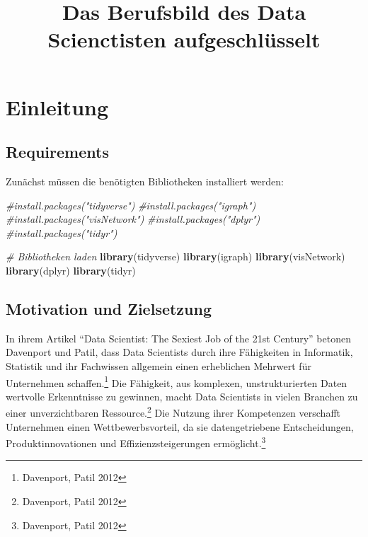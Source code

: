 \documentclass[
]{article}
\title{Das Berufsbild des Data Scienctisten aufgeschlüsselt}
\author{}
\date{\vspace{-2.5em}}
\newenvironment{Shaded}{\begin{snugshade}}{\end{snugshade}}
\newcommand{\CommentTok}[1]{\textcolor[rgb]{0.56,0.35,0.01}{\textit{#1}}}
\newcommand{\FunctionTok}[1]{\textcolor[rgb]{0.13,0.29,0.53}{\textbf{#1}}}
\newcommand{\NormalTok}[1]{#1}
\begin{document}
\maketitle

{
\setcounter{tocdepth}{3}
\tableofcontents
}
\newpage

\section{Einleitung}\label{einleitung}

\subsection{Requirements}\label{requirements}

Zunächst müssen die benötigten Bibliotheken installiert werden:

\begin{Shaded}
\begin{Highlighting}[]
\CommentTok{\#install.packages("tidyverse")}
\CommentTok{\#install.packages("igraph")}
\CommentTok{\#install.packages("visNetwork")}
\CommentTok{\#install.packages("dplyr")}
\CommentTok{\#install.packages("tidyr")}
\end{Highlighting}
\end{Shaded}

\begin{Shaded}
\begin{Highlighting}[]
\CommentTok{\# Bibliotheken laden}
\FunctionTok{library}\NormalTok{(tidyverse)}
\FunctionTok{library}\NormalTok{(igraph)}
\FunctionTok{library}\NormalTok{(visNetwork)}
\FunctionTok{library}\NormalTok{(dplyr)}
\FunctionTok{library}\NormalTok{(tidyr)}
\end{Highlighting}
\end{Shaded}

\subsection{Motivation und
Zielsetzung}\label{motivation-und-zielsetzung}

In ihrem Artikel ``Data Scientist: The Sexiest Job of the 21st Century''
betonen Davenport und Patil, dass Data Scientists durch ihre Fähigkeiten
in Informatik, Statistik und ihr Fachwissen allgemein einen erheblichen
Mehrwert für Unternehmen schaffen.\footnote{Davenport, Patil 2012} Die
Fähigkeit, aus komplexen, unstrukturierten Daten wertvolle Erkenntnisse
zu gewinnen, macht Data Scientists in vielen Branchen zu einer
unverzichtbaren Ressource.\footnote{Davenport, Patil 2012} Die Nutzung
ihrer Kompetenzen verschafft Unternehmen einen Wettbewerbsvorteil, da
sie datengetriebene Entscheidungen, Produktinnovationen und
Effizienzsteigerungen ermöglicht.\footnote{Davenport, Patil 2012}
\end{document}
